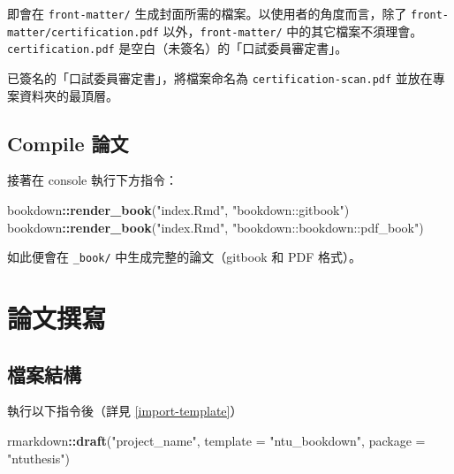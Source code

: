 \documentclass[oneside]{book}
\newenvironment{Shaded}{\begin{snugshade}}{\end{snugshade}}
\newcommand{\DataTypeTok}[1]{\textcolor[rgb]{0.13,0.29,0.53}{#1}}
\newcommand{\KeywordTok}[1]{\textcolor[rgb]{0.13,0.29,0.53}{\textbf{#1}}}
\newcommand{\NormalTok}[1]{#1}
\newcommand{\OperatorTok}[1]{\textcolor[rgb]{0.81,0.36,0.00}{\textbf{#1}}}
\newcommand{\StringTok}[1]{\textcolor[rgb]{0.31,0.60,0.02}{#1}}
\begin{document}
即會在 \texttt{front-matter/} 生成封面所需的檔案。以使用者的角度而言，除了 \texttt{front-matter/certification.pdf} 以外，\texttt{front-matter/} 中的其它檔案不須理會。\texttt{certification.pdf} 是空白（未簽名）的「口試委員審定書」。

已簽名的「口試委員審定書」，將檔案命名為 \texttt{certification-scan.pdf} 並放在專案資料夾的最頂層。

\hypertarget{compile-thesis}{%
\section{Compile 論文}\label{compile-thesis}}

接著在 console 執行下方指令：

\begin{Shaded}
\begin{Highlighting}[]
\NormalTok{bookdown}\OperatorTok{::}\KeywordTok{render_book}\NormalTok{(}\StringTok{"index.Rmd"}\NormalTok{, }\StringTok{"bookdown::gitbook"}\NormalTok{)}
\NormalTok{bookdown}\OperatorTok{::}\KeywordTok{render_book}\NormalTok{(}\StringTok{"index.Rmd"}\NormalTok{, }\StringTok{"bookdown::bookdown::pdf_book"}\NormalTok{)}
\end{Highlighting}
\end{Shaded}

如此便會在 \texttt{\_book/} 中生成完整的論文（gitbook 和 PDF 格式）。

\hypertarget{write-thesis}{%
\chapter{論文撰寫}\label{write-thesis}}

\hypertarget{dir-structure}{%
\section{檔案結構}\label{dir-structure}}

執行以下指令後（詳見 \ref{import-template}）

\begin{Shaded}
\begin{Highlighting}[]
\NormalTok{rmarkdown}\OperatorTok{::}\KeywordTok{draft}\NormalTok{(}\StringTok{"project_name"}\NormalTok{,}
                 \DataTypeTok{template =} \StringTok{"ntu_bookdown"}\NormalTok{,}
                 \DataTypeTok{package =} \StringTok{"ntuthesis"}\NormalTok{)}
\end{Highlighting}
\end{Shaded}
\end{document}
